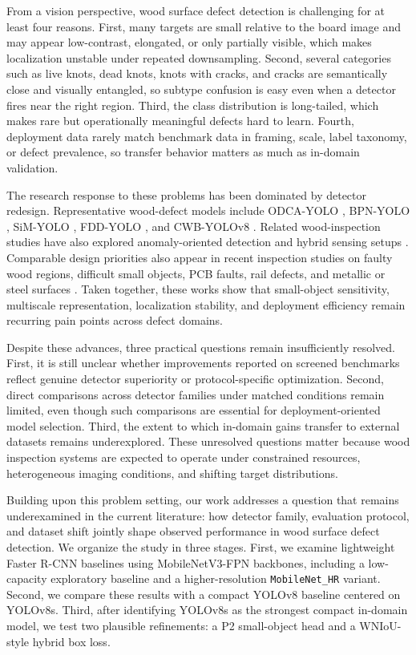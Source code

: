 From a vision perspective, wood surface defect detection is challenging for at least four reasons. First, many targets are small relative to the board image and may appear low-contrast, elongated, or only partially visible, which makes localization unstable under repeated downsampling. Second, several categories such as live knots, dead knots, knots with cracks, and cracks are semantically close and visually entangled, so subtype confusion is easy even when a detector fires near the right region. Third, the class distribution is long-tailed, which makes rare but operationally meaningful defects hard to learn. Fourth, deployment data rarely match benchmark data in framing, scale, label taxonomy, or defect prevalence, so transfer behavior matters as much as in-domain validation.

The research response to these problems has been dominated by detector redesign. Representative wood-defect models include ODCA-YOLO \citep{odca_yolo}, BPN-YOLO \citep{bpn_yolo}, SiM-YOLO \citep{sim_yolo}, FDD-YOLO \citep{fdd_yolo}, and CWB-YOLOv8 \citep{an_cwb_yolov8}. Related wood-inspection studies have also explored anomaly-oriented detection and hybrid sensing setups \citep{kilic_2024,kilic_2025_wd_detector}. Comparable design priorities also appear in recent inspection studies on faulty wood regions, difficult small objects, PCB faults, rail defects, and metallic or steel surfaces \citep{cmc_wood_area_attention,cmc_insulator_small,cmc_pcb_yolov8,cmc_cg_yolov8,cmc_rail_upernet,cmc_yolo_rlc,cmc_lmvit,cmc_msese,cmc_flame,cmc_channel_shuffle}. Taken together, these works show that small-object sensitivity, multiscale representation, localization stability, and deployment efficiency remain recurring pain points across defect domains.

Despite these advances, three practical questions remain insufficiently resolved. First, it is still unclear whether improvements reported on screened benchmarks reflect genuine detector superiority or protocol-specific optimization. Second, direct comparisons across detector families under matched conditions remain limited, even though such comparisons are essential for deployment-oriented model selection. Third, the extent to which in-domain gains transfer to external datasets remains underexplored. These unresolved questions matter because wood inspection systems are expected to operate under constrained resources, heterogeneous imaging conditions, and shifting target distributions.

Building upon this problem setting, our work addresses a question that remains underexamined in the current literature: how detector family, evaluation protocol, and dataset shift jointly shape observed performance in wood surface defect detection. We organize the study in three stages. First, we examine lightweight Faster R-CNN baselines using MobileNetV3-FPN backbones, including a low-capacity exploratory baseline and a higher-resolution \texttt{MobileNet\_HR} variant. Second, we compare these results with a compact YOLOv8 baseline centered on YOLOv8s. Third, after identifying YOLOv8s as the strongest compact in-domain model, we test two plausible refinements: a P2 small-object head and a WNIoU-style hybrid box loss.

